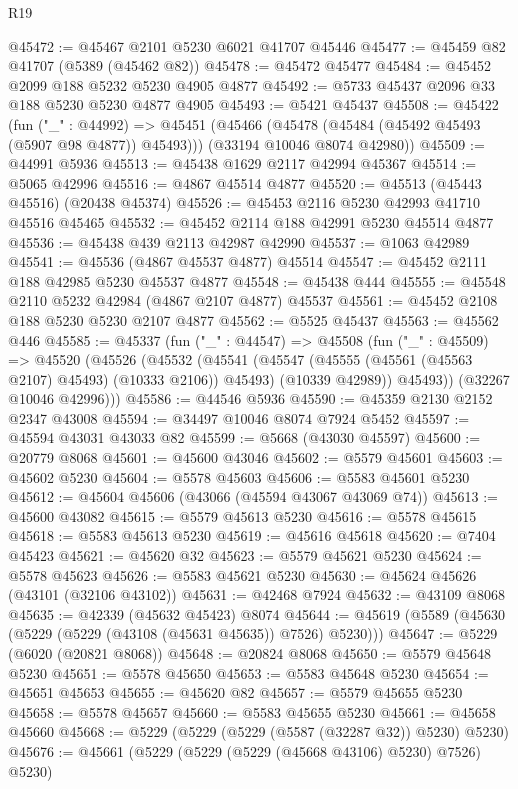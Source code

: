 \begin{lexlean}{R19}
\begin{coremodule}
@45472 := @45467 @2101 @5230 @6021 @41707 @45446
@45477 := @45459 @82 @41707 (@5389 (@45462 @82))
@45478 := @45472 @45477
@45484 := @45452 @2099 @188 @5232 @5230 @4905 @4877
@45492 := @5733 @45437 @2096 @33 @188 @5230 @5230 @4877 @4905
@45493 := @5421 @45437
@45508 := @45422
    (fun ("_" : @44992) =>
    @45451
      (@45466 (@45478 (@45484 (@45492 @45493 (@5907 @98 @4877)) @45493)))
      (@33194 @10046 @8074 @42980))
@45509 := @44991 @5936
@45513 := @45438 @1629 @2117 @42994 @45367
@45514 := @5065 @42996
@45516 := @4867 @45514 @4877
@45520 := @45513 (@45443 @45516) (@20438 @45374)
@45526 := @45453 @2116 @5230 @42993 @41710 @45516 @45465
@45532 := @45452 @2114 @188 @42991 @5230 @45514 @4877
@45536 := @45438 @439 @2113 @42987 @42990
@45537 := @1063 @42989
@45541 := @45536 (@4867 @45537 @4877) @45514
@45547 := @45452 @2111 @188 @42985 @5230 @45537 @4877
@45548 := @45438 @444
@45555 := @45548 @2110 @5232 @42984 (@4867 @2107 @4877) @45537
@45561 := @45452 @2108 @188 @5230 @5230 @2107 @4877
@45562 := @5525 @45437
@45563 := @45562 @446
@45585 := @45337
    (fun ("_" : @44547) =>
    @45508
      (fun ("_" : @45509) =>
      @45520
        (@45526
          (@45532
            (@45541
              (@45547 (@45555 (@45561 (@45563 @2107) @45493) (@10333 @2106)) @45493)
              (@10339 @42989))
            @45493))
        (@32267 @10046 @42996)))
@45586 := @44546 @5936
@45590 := @45359 @2130 @2152 @2347 @43008
@45594 := @34497 @10046 @8074 @7924 @5452
@45597 := @45594 @43031 @43033 @82
@45599 := @5668 (@43030 @45597)
@45600 := @20779 @8068
@45601 := @45600 @43046
@45602 := @5579 @45601
@45603 := @45602 @5230
@45604 := @5578 @45603
@45606 := @5583 @45601 @5230
@45612 := @45604 @45606 (@43066 (@45594 @43067 @43069 @74))
@45613 := @45600 @43082
@45615 := @5579 @45613 @5230
@45616 := @5578 @45615
@45618 := @5583 @45613 @5230
@45619 := @45616 @45618
@45620 := @7404 @45423
@45621 := @45620 @32
@45623 := @5579 @45621 @5230
@45624 := @5578 @45623
@45626 := @5583 @45621 @5230
@45630 := @45624 @45626 (@43101 (@32106 @43102))
@45631 := @42468 @7924
@45632 := @43109 @8068
@45635 := @42339 (@45632 @45423) @8074
@45644 := @45619 (@5589 (@45630 (@5229 (@5229 (@43108 (@45631 @45635)) @7526) @5230)))
@45647 := @5229 (@6020 (@20821 @8068))
@45648 := @20824 @8068
@45650 := @5579 @45648 @5230
@45651 := @5578 @45650
@45653 := @5583 @45648 @5230
@45654 := @45651 @45653
@45655 := @45620 @82
@45657 := @5579 @45655 @5230
@45658 := @5578 @45657
@45660 := @5583 @45655 @5230
@45661 := @45658 @45660
@45668 := @5229 (@5229 (@5229 (@5587 (@32287 @32)) @5230) @5230)
@45676 := @45661 (@5229 (@5229 (@5229 (@45668 @43106) @5230) @7526) @5230)

\end{coremodule}
\end{lexlean}
